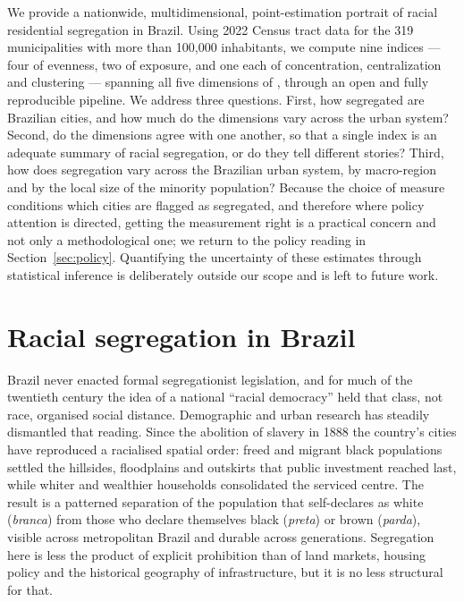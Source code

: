 \documentclass[pdflatex,sn-basic]{sn-jnl}%
\begin{document}
We provide a nationwide, multidimensional, point-estimation portrait of racial residential segregation in Brazil. Using 2022 Census tract data for the 319 municipalities with more than 100{,}000 inhabitants, we compute nine indices --- four of evenness, two of exposure, and one each of concentration, centralization and clustering --- spanning all five dimensions of \citet{massey1988dimensions}, through an open and fully reproducible pipeline. We address three questions. First, how segregated are Brazilian cities, and how much do the dimensions vary across the urban system? Second, do the dimensions agree with one another, so that a single index is an adequate summary of racial segregation, or do they tell different stories? Third, how does segregation vary across the Brazilian urban system, by macro-region and by the local size of the minority population? Because the choice of measure conditions which cities are flagged as segregated, and therefore where policy attention is directed, getting the measurement right is a practical concern and not only a methodological one; we return to the policy reading in Section~\ref{sec:policy}. Quantifying the uncertainty of these estimates through statistical inference is deliberately outside our scope and is left to future work.

\section{Racial segregation in Brazil}\label{sec:brazil}

Brazil never enacted formal segregationist legislation, and for much of the twentieth century the idea of a national ``racial democracy'' held that class, not race, organised social distance. Demographic and urban research has steadily dismantled that reading. Since the abolition of slavery in 1888 the country's cities have reproduced a racialised spatial order: freed and migrant black populations settled the hillsides, floodplains and outskirts that public investment reached last, while whiter and wealthier households consolidated the serviced centre. The result is a patterned separation of the population that self-declares as white (\emph{branca}) from those who declare themselves black (\emph{preta}) or brown (\emph{parda}), visible across metropolitan Brazil and durable across generations. Segregation here is less the product of explicit prohibition than of land markets, housing policy and the historical geography of infrastructure, but it is no less structural for that.
\end{document}
